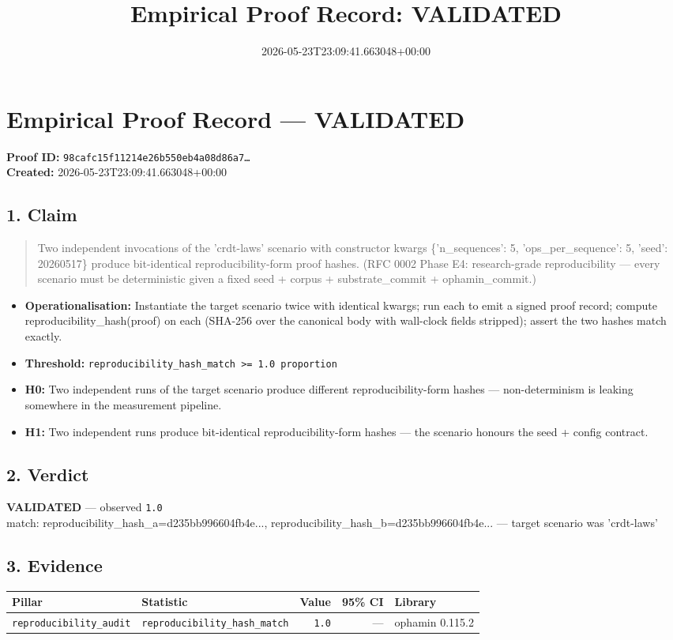 \documentclass{article}
\title{Empirical Proof Record: VALIDATED}
\date{2026-05-23T23:09:41.663048+00:00}
\begin{document}
\maketitle
\section*{Empirical Proof Record --- \textcolor{validated}{\textbf{VALIDATED}}}
\textbf{Proof ID:} \texttt{98cafc15f11214e26b550eb4a08d86a7\dots}\\
\textbf{Created:} 2026-05-23T23:09:41.663048+00:00
\subsection*{1. Claim}
\begin{quote}Two independent invocations of the 'crdt-laws' scenario with constructor kwargs \{'n\_sequences': 5, 'ops\_per\_sequence': 5, 'seed': 20260517\} produce bit-identical reproducibility-form proof hashes. (RFC 0002 Phase E4: research-grade reproducibility — every scenario must be deterministic given a fixed seed + corpus + substrate\_commit + ophamin\_commit.)\end{quote}
\begin{itemize}
\item \textbf{Operationalisation:} Instantiate the target scenario twice with identical kwargs; run each to emit a signed proof record; compute reproducibility\_hash(proof) on each (SHA-256 over the canonical body with wall-clock fields stripped); assert the two hashes match exactly.
\item \textbf{Threshold:} \texttt{reproducibility\_hash\_match >= 1.0 proportion}
\item \textbf{H0:} Two independent runs of the target scenario produce different reproducibility-form hashes — non-determinism is leaking somewhere in the measurement pipeline.
\item \textbf{H1:} Two independent runs produce bit-identical reproducibility-form hashes — the scenario honours the seed + config contract.
\end{itemize}
\subsection*{2. Verdict}
\textcolor{validated}{\textbf{VALIDATED}} --- observed \texttt{1.0}\\
match: reproducibility\_hash\_a=d235bb996604fb4e..., reproducibility\_hash\_b=d235bb996604fb4e... — target scenario was 'crdt-laws'
\subsection*{3. Evidence}
\begin{tabular}{llrrl}\toprule
\textbf{Pillar} & \textbf{Statistic} & \textbf{Value} & \textbf{95\% CI} & \textbf{Library} \\\midrule
\texttt{reproducibility\_audit} & \texttt{reproducibility\_hash\_match} & \texttt{1.0} & --- & ophamin 0.115.2 \\
\bottomrule\end{tabular}
\end{document}
